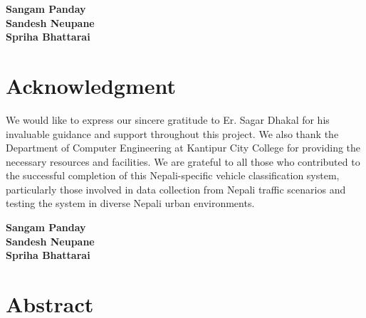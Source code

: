 \documentclass[12pt,a4paper]{report}
\begin{document}
\vspace{1cm}
\noindent\textbf{Sangam Panday}\\
\textbf{Sandesh Neupane}\\
\textbf{Spriha Bhattarai}

\newpage

\chapter*{Acknowledgment}

We would like to express our sincere gratitude to Er. Sagar Dhakal for his invaluable guidance and support throughout this project. We also thank the Department of Computer Engineering at Kantipur City College for providing the necessary resources and facilities. We are grateful to all those who contributed to the successful completion of this Nepali-specific vehicle classification system, particularly those involved in data collection from Nepali traffic scenarios and testing the system in diverse Nepali urban environments.

\vspace{1cm}
\begin{flushright}
\textbf{Sangam Panday}\\
\textbf{Sandesh Neupane}\\
\textbf{Spriha Bhattarai}
\end{flushright}

\newpage

\chapter*{Abstract}
\end{document}
